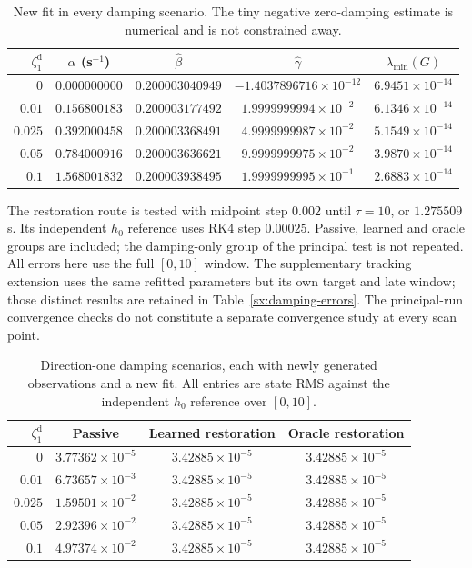 \begin{table}[t]
\centering
\caption{New fit in every damping scenario. The tiny negative
zero-damping estimate is numerical and is not constrained away.}
\label{sx:damping-fit}
\setlength{\tabcolsep}{5pt}
\begin{tabular}{rcccc}
\toprule
$\zeta_1^{\mathrm{d}}$ & $\alpha$ (s$^{-1}$) & $\widehat\beta$ & $\widehat\gamma$ & $\lambda_{\min}(G)$\\
\midrule
$0$ & $0.000000000$ & $0.200003040949$ & $-1.4037896716\times10^{-12}$ & $6.9451\times10^{-14}$ \\
$0.01$ & $0.156800183$ & $0.200003177492$ & $1.9999999994\times10^{-2}$ & $6.1346\times10^{-14}$ \\
$0.025$ & $0.392000458$ & $0.200003368491$ & $4.9999999987\times10^{-2}$ & $5.1549\times10^{-14}$ \\
$0.05$ & $0.784000916$ & $0.200003636621$ & $9.9999999975\times10^{-2}$ & $3.9870\times10^{-14}$ \\
$0.1$ & $1.568001832$ & $0.200003938495$ & $1.9999999995\times10^{-1}$ & $2.6883\times10^{-14}$ \\
\bottomrule
\end{tabular}
\end{table}

The restoration route is tested with midpoint step $0.002$ until
$\tau=10$, or $1.275509$ s. Its independent $h_0$ reference uses
RK4 step $0.00025$. Passive, learned and oracle groups are included;
the damping-only group of the principal test is not repeated. All errors
here use the full $[0,10]$ window. The supplementary tracking extension
uses the same refitted parameters but its own target and late window;
those distinct results are retained in Table~\ref{sx:damping-errors}.
The principal-run convergence checks do not constitute a separate
convergence study at every scan point.

\begin{table}[t]
\centering
\caption{Direction-one damping scenarios, each with newly generated observations and a new fit. All entries are state RMS against the independent $h_0$ reference over $[0,10]$.}
\label{sx:framework-damping-a}
\begin{tabular}{rccc}
\toprule
$\zeta_1^{\mathrm d}$ & Passive & Learned restoration & Oracle restoration\\
\midrule
$0$ & $3.77362\times10^{-5}$ & $3.42885\times10^{-5}$ & $3.42885\times10^{-5}$ \\
$0.01$ & $6.73657\times10^{-3}$ & $3.42885\times10^{-5}$ & $3.42885\times10^{-5}$ \\
$0.025$ & $1.59501\times10^{-2}$ & $3.42885\times10^{-5}$ & $3.42885\times10^{-5}$ \\
$0.05$ & $2.92396\times10^{-2}$ & $3.42885\times10^{-5}$ & $3.42885\times10^{-5}$ \\
$0.1$ & $4.97374\times10^{-2}$ & $3.42885\times10^{-5}$ & $3.42885\times10^{-5}$ \\
\bottomrule
\end{tabular}
\end{table}

